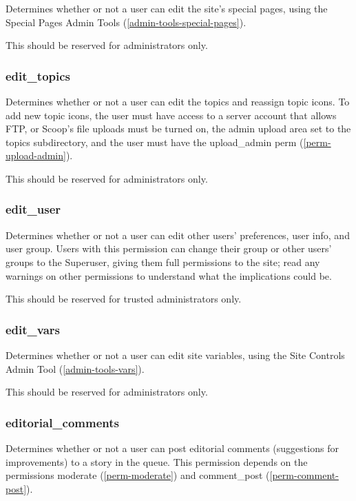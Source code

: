Determines whether or not a user can edit the site's special pages, using the Special Pages Admin Tools (\ref{admin-tools-special-pages}).

This should be reserved for administrators only.

\subsubsection{edit\_topics}
\label{perm-edit-topics}

Determines whether or not a user can edit the topics and reassign topic icons.  To add new topic icons, the user must have access to a server account that allows FTP, or Scoop's file uploads must be turned on, the admin upload area set to the topics subdirectory, and the user must have the upload\_admin perm (\ref{perm-upload-admin}).

This should be reserved for administrators only.

\subsubsection{edit\_user}
\label{perm-edit-user}

Determines whether or not a user can edit other users' preferences, user info, and user group.  Users with this permission can change their group or other users' groups to the Superuser, giving them full permissions to the site; read any warnings on other permissions to understand what the implications could be.

This should be reserved for trusted administrators only.

\subsubsection{edit\_vars}
\label{perm-edit-vars}

Determines whether or not a user can edit site variables, using the Site Controls Admin Tool (\ref{admin-tools-vars}).

This should be reserved for administrators only.

\subsubsection{editorial\_comments}
\label{perm-editorial-comments}

Determines whether or not a user can post editorial comments (suggestions for improvements) to a story in the queue.  This permission depends on the permissions moderate (\ref{perm-moderate}) and comment\_post (\ref{perm-comment-post}).

